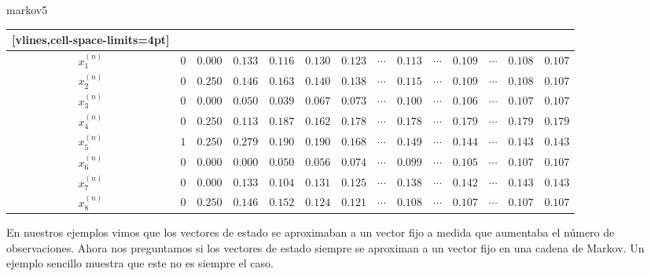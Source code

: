 \begin{examplebox}{}{markov5}
\begin{adjustwidth}{-7.5cm}{-2cm}
\begin{NiceTabular}{cccccccccccccc}[vlines,cell-space-limits=4pt]
            \hspace{1.5cm} & \\
            \hline
            $x_1^{(n)}$ & $0$ & $0.000$ & $0.133$ & $0.116$ & $0.130$ & $0.123$ & $\cdots$ & $0.113$ & $\cdots$ & $0.109$ & $\cdots$ & $0.108$ & $0.107$ \\
            $x_2^{(n)}$ & $0$ & $0.250$ & $0.146$ & $0.163$ & $0.140$ & $0.138$ & $\cdots$ & $0.115$ & $\cdots$ & $0.109$ & $\cdots$ & $0.108$ & $0.107$ \\
            $x_3^{(n)}$ & $0$ & $0.000$ & $0.050$ & $0.039$ & $0.067$ & $0.073$ & $\cdots$ & $0.100$ & $\cdots$ & $0.106$ & $\cdots$ & $0.107$ & $0.107$ \\
            $x_4^{(n)}$ & $0$ & $0.250$ & $0.113$ & $0.187$ & $0.162$ & $0.178$ & $\cdots$ & $0.178$ & $\cdots$ & $0.179$ & $\cdots$ & $0.179$ & $0.179$ \\
            $x_5^{(n)}$ & $1$ & $0.250$ & $0.279$ & $0.190$ & $0.190$ & $0.168$ & $\cdots$ & $0.149$ & $\cdots$ & $0.144$ & $\cdots$ & $0.143$ & $0.143$ \\
            $x_6^{(n)}$ & $0$ & $0.000$ & $0.000$ & $0.050$ & $0.056$ & $0.074$ & $\cdots$ & $0.099$ & $\cdots$ & $0.105$ & $\cdots$ & $0.107$ & $0.107$ \\
            $x_7^{(n)}$ & $0$ & $0.000$ & $0.133$ & $0.104$ & $0.131$ & $0.125$ & $\cdots$ & $0.138$ & $\cdots$ & $0.142$ & $\cdots$ & $0.143$ & $0.143$ \\
            $x_8^{(n)}$ & $0$ & $0.250$ & $0.146$ & $0.152$ & $0.124$ & $0.121$ & $\cdots$ & $0.108$ & $\cdots$ & $0.107$ & $\cdots$ & $0.107$ & $0.107$ \\
            \hline
        \end{NiceTabular} \vspace{0.3cm}
    \end{adjustwidth}
\end{examplebox}

En nuestros ejemplos vimos que los vectores de estado se aproximaban a un vector fijo a medida que aumentaba el número de observaciones. Ahora nos preguntamos si los vectores de estado siempre se aproximan a un vector fijo en una cadena de Markov. Un ejemplo sencillo muestra que este no es siempre el caso.

\newpage

